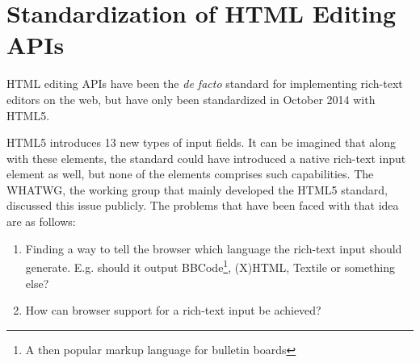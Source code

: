 
\section{Standardization of HTML Editing APIs}
\label{sec:standardization-of-html-editing-apis}





HTML editing APIs have been the \textit{de facto} standard for implementing rich-text editors on the web, but have only been standardized in October 2014 with HTML5. 

HTML5 introduces 13 new types of input fields\cite{HTML5}. It can be imagined that along with these elements, the standard could have introduced a native rich-text input element as well, but none of the elements comprises such capabilities. The WHATWG, the working group that mainly developed the HTML5 standard, discussed this issue publicly. The problems that have been faced with that idea are as follows:


\begin{enumerate} 
\item Finding a way to tell the browser which language the rich-text input should generate. E.g. should it output BBCode\footnote{A then popular markup language for bulletin boards}, (X)HTML, Textile or something else?
\item How can browser support for a rich-text input be achieved?
\end{enumerate}

